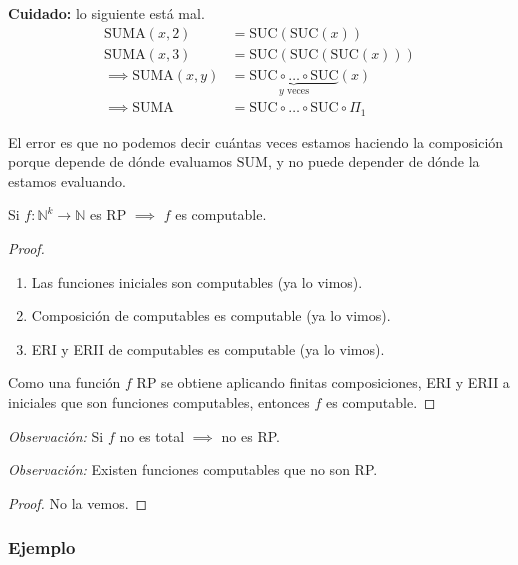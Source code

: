 \textbf{Cuidado:} lo siguiente está mal.
\begin{align*}
    \mathrm{SUMA}(x,2) &= \mathrm{SUC}( \mathrm{SUC} (x)) \\
    \mathrm{SUMA}(x,3) &= \mathrm{SUC}( \mathrm{SUC}( \mathrm{SUC} (x))) \\
    \implies \mathrm{SUMA}(x,y) &= \underbrace{\mathrm{SUC} \circ \dotsc 
    \circ \mathrm{SUC}}_{y \text{ veces}}(x) \\
    \implies \mathrm{SUMA} &=  \mathrm{SUC} \circ \dotsc \circ \mathrm{SUC} 
    \circ \Pi_1
\end{align*}

El error es que no podemos decir cuántas veces estamos haciendo la composición
porque depende de dónde evaluamos $\mathrm{SUM}$, y no puede depender de dónde
la estamos evaluando.

\bigskip

\begin{teorema}{}{}
    Si $f: \mathbb{N}^k \to \mathbb{N}$ es RP $\implies$ $f$ es computable.
\end{teorema}

\begin{proof} \phantom{.}

    \begin{enumerate}
        \item Las funciones iniciales son computables (ya lo vimos).
        \item Composición de computables es computable (ya lo vimos).
        \item ERI y ERII de computables es computable (ya lo vimos).
    \end{enumerate}

    Como una función $f$ RP se obtiene aplicando finitas composiciones, ERI
    y ERII a iniciales que son funciones computables, entonces $f$ es 
    computable.

\end{proof}

\bigskip
\textit{Observación:}
Si $f$ no es total $\implies$ no es RP.

\bigskip
\textit{Observación:}
Existen funciones computables que no son RP.

\begin{proof}
    No la vemos.
\end{proof}

\subsubsection{Ejemplo}

